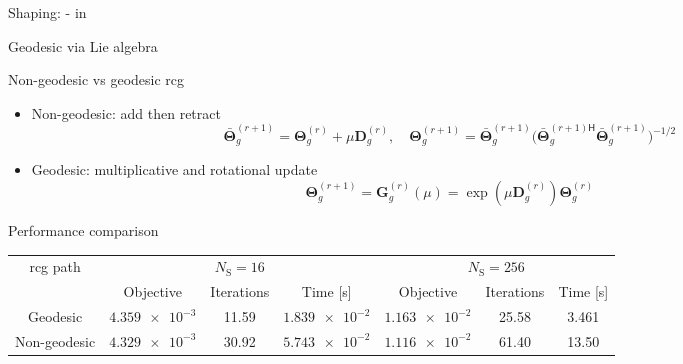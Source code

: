 \documentclass[presentation,xcolor={table},9pt]{beamer}
\begin{document}
\begin{section}{Shaping: - in }
	\begin{frame}{Geodesic  via Lie algebra}
		\begin{block}{Non-geodesic vs geodesic \gls{rcg}}
			\begin{itemize}
				\item Non-geodesic: add then retract
				\begin{equation*}
					\bar{\mathbf{\Theta}}_g^{(r+1)} = \mathbf{\Theta}_g^{(r)} + \mu \mathbf{D}_g^{(r)}, \quad \mathbf{\Theta}_g^{(r+1)} = \bar{\mathbf{\Theta}}_g^{(r+1)} \bigl({\bar{\mathbf{\Theta}}_g^{(r+1)\mathsf{H}}} \bar{\mathbf{\Theta}}_g^{(r+1)}\bigr)^{-1/2}
				\end{equation*}
				\item Geodesic: multiplicative and rotational update
				\begin{equation*}
					\mathbf{\Theta}_g^{(r+1)} = \mathbf{G}_g^{(r)}(\mu) = \exp(\mu \mathbf{D}_g^{(r)}) \mathbf{\Theta}_g^{(r)}
					\label{eq:update_geodesic}
				\end{equation*}
			\end{itemize}
		\end{block}
		\begin{exampleblock}{Performance comparison}
			\begin{table}
				\label{tb:complexity_test}
				\centering
				\tiny
				\begin{tabular}{ccccccc}
					\toprule
					\multirow{2}{*}{\gls{rcg} path} & \multicolumn{3}{c}{$N_\mathrm{S}=16$} & \multicolumn{3}{c}{$N_\mathrm{S}=256$}                                                               \\ \cmidrule(lr){2-4} \cmidrule(lr){5-7}
													& Objective                             & Iterations                             & Time [s]         & Objective        & Iterations & Time [s] \\ \midrule
					Geodesic                        & $\num{4.359e-3}$                      & 11.59                                  & $\num{1.839e-2}$ & $\num{1.163e-2}$ & 25.58      & 3.461    \\
					Non-geodesic                    & $\num{4.329e-3}$                      & 30.92                                  & $\num{5.743e-2}$ & $\num{1.116e-2}$ & 61.40      & 13.50    \\ \bottomrule
				\end{tabular}
			\end{table}
		\end{exampleblock}
	\end{frame}


\end{section}
\end{document}
